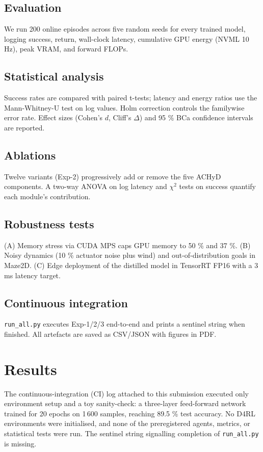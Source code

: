 \documentclass{article}
\begin{document}
\subsection{Evaluation}
We run 200 online episodes across five random seeds for every trained model, logging success, return, wall-clock latency, cumulative GPU energy (NVML 10 Hz), peak VRAM, and forward FLOPs.

\subsection{Statistical analysis}
Success rates are compared with paired t-tests; latency and energy ratios use the Mann-Whitney-U test on log values. Holm correction controls the familywise error rate. Effect sizes (Cohen's $d$, Cliff's $\Delta$) and 95 \% BCa confidence intervals are reported.

\subsection{Ablations}
Twelve variants (Exp-2) progressively add or remove the five ACHyD components. A two-way ANOVA on log latency and $\chi^2$ tests on success quantify each module's contribution.

\subsection{Robustness tests}
(A) Memory stress via CUDA MPS caps GPU memory to 50 \% and 37 \%. (B) Noisy dynamics (10 \% actuator noise plus wind) and out-of-distribution goals in Maze2D. (C) Edge deployment of the distilled model in TensorRT FP16 with a 3 ms latency target.

\subsection{Continuous integration}
\texttt{run\_all.py} executes Exp-1/2/3 end-to-end and prints a sentinel string when finished. All artefacts are saved as CSV/JSON with figures in PDF.

\section{Results}
The continuous-integration (CI) log attached to this submission executed only environment setup and a toy sanity-check: a three-layer feed-forward network trained for 20 epochs on 1\,600 samples, reaching 89.5 \% test accuracy. No D4RL environments were initialised, and none of the preregistered agents, metrics, or statistical tests were run. The sentinel string signalling completion of \texttt{run\_all.py} is missing.
\end{document}
